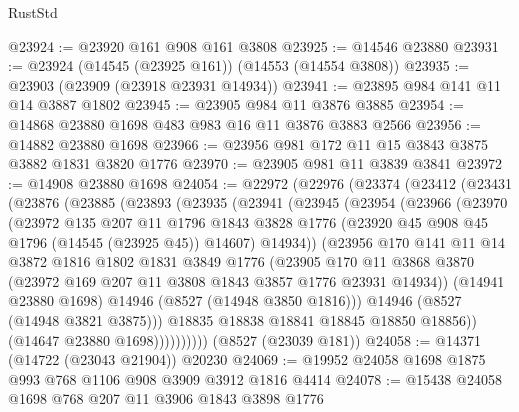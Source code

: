 \begin{lexlean}{RustStd}
\begin{coremodule}
@23924 := @23920 @161 @908 @161 @3808
@23925 := @14546 @23880
@23931 := @23924 (@14545 (@23925 @161)) (@14553 (@14554 @3808))
@23935 := @23903 (@23909 (@23918 @23931 @14934))
@23941 := @23895 @984 @141 @11 @14 @3887 @1802
@23945 := @23905 @984 @11 @3876 @3885
@23954 := @14868 @23880 @1698 @483 @983 @16 @11 @3876 @3883 @2566
@23956 := @14882 @23880 @1698
@23966 := @23956 @981 @172 @11 @15 @3843 @3875 @3882 @1831 @3820 @1776
@23970 := @23905 @981 @11 @3839 @3841
@23972 := @14908 @23880 @1698
@24054 := @22972
    (@22976
      (@23374
        (@23412
          (@23431
            (@23876
              (@23885
                (@23893
                  (@23935
                    (@23941
                      (@23945
                        (@23954
                          (@23966
                            (@23970
                              (@23972
                                @135
                                @207
                                @11
                                @1796
                                @1843
                                @3828
                                @1776
                                (@23920 @45 @908 @45 @1796 (@14545 (@23925 @45)) @14607)
                                @14934))
                            (@23956
                              @170
                              @141
                              @11
                              @14
                              @3872
                              @1816
                              @1802
                              @1831
                              @3849
                              @1776
                              (@23905
                                @170
                                @11
                                @3868
                                @3870
                                (@23972 @169 @207 @11 @3808 @1843 @3857 @1776 @23931 @14934))
                              (@14941 @23880 @1698)
                              @14946
                              (@8527 (@14948 @3850 @1816)))
                            @14946
                            (@8527 (@14948 @3821 @3875)))
                          @18835
                          @18838
                          @18841
                          @18845
                          @18850
                          @18856))
                      (@14647 @23880 @1698))))))))))
    (@8527 (@23039 @181))
@24058 := @14371 (@14722 (@23043 @21904)) @20230
@24069 := @19952 @24058 @1698 @1875 @993 @768 @1106 @908 @3909 @3912 @1816 @4414
@24078 := @15438 @24058 @1698 @768 @207 @11 @3906 @1843 @3898 @1776

\end{coremodule}
\end{lexlean}
